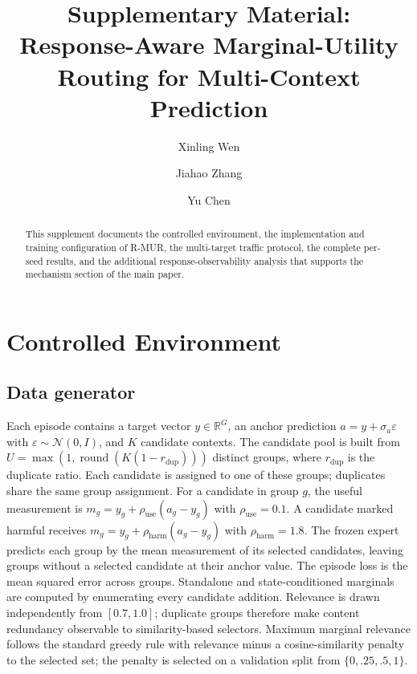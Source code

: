 \documentclass[preprint,12pt]{elsarticle}
\begin{document}
\begin{frontmatter}
\title{Supplementary Material: Response-Aware Marginal-Utility Routing for Multi-Context Prediction}
\ifdefined\anonymousmode
\author{}
\else
\author[zua]{Xinling Wen}
\author[zua]{Jiahao Zhang}
\author[zua]{Yu Chen}
\fi
\begin{abstract}
This supplement documents the controlled environment, the implementation and
training configuration of R-MUR, the multi-target traffic protocol, the
complete per-seed results, and the additional response-observability analysis
that supports the mechanism section of the main paper.
\end{abstract}
\end{frontmatter}

\section{Controlled Environment}

\subsection{Data generator}
Each episode contains a target vector $y\in\mathbb{R}^{G}$, an anchor prediction
$a=y+\sigma_a\varepsilon$ with $\varepsilon\sim\mathcal{N}(0,I)$, and $K$
candidate contexts. The candidate pool is built from
$U=\max(1,\operatorname{round}(K(1-r_{\mathrm{dup}})))$ distinct groups, where
$r_{\mathrm{dup}}$ is the duplicate ratio. Each candidate is assigned to one of
these groups; duplicates share the same group assignment. For a candidate in
group $g$, the useful measurement is $m_g=y_g+\rho_{\mathrm{use}}(a_g-y_g)$ with
$\rho_{\mathrm{use}}=0.1$. A candidate marked harmful receives
$m_g=y_g+\rho_{\mathrm{harm}}(a_g-y_g)$ with $\rho_{\mathrm{harm}}=1.8$. The
frozen expert predicts each group by the mean measurement of its selected
candidates, leaving groups without a selected candidate at their anchor value.
The episode loss is the mean squared error across groups. Standalone and
state-conditioned marginals are computed by enumerating every candidate
addition. Relevance is drawn independently from $[0.7,1.0]$; duplicate groups
therefore make content redundancy observable to similarity-based selectors.
Maximum marginal relevance follows the standard greedy rule with relevance
minus a cosine-similarity penalty to the selected set; the penalty is selected
on a validation split from $\{0,.25,.5,1\}$.
\end{document}
